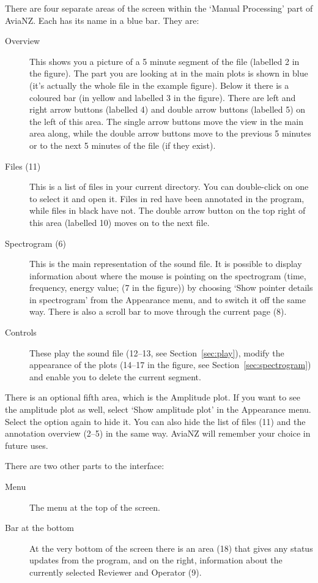 \documentclass{article}
\begin{document}
There are four separate areas of the screen within the `Manual Processing' part of AviaNZ. Each has its name in a blue bar. They are:
	\begin{description}
	\item[Overview] This shows you a picture of a 5 minute segment of the file (labelled 2 in the figure). The part you are looking at in the main plots is shown in blue (it's actually the whole file in the example figure). Below it there is a coloured bar (in yellow and labelled 3 in the figure). There are left and right arrow buttons (labelled 4) and double arrow buttons (labelled 5) on the left of this area. The single arrow buttons move the view in the main area along, while the double arrow buttons move to the previous 5 minutes or to the next 5 minutes of the file (if they exist). 
	\item [Files (11)] This is a list of files in your current directory. You can double-click on one to select it and open it. Files in red have been annotated in the program, while files in black have not. The double arrow button on the top right of this area (labelled 10) moves on to the next file.
	\item[Spectrogram (6)] This is the main representation of the sound file. It is possible to display information about where the mouse is pointing on the spectrogram (time, frequency, energy value; (7 in the figure)) by choosing `Show pointer details in spectrogram' from the Appearance menu, and to switch it off the same way. There is also a scroll bar to move through the current page (8).
	\item[Controls] These play the sound file (12--13, see Section~\ref{sec:play}), modify the appearance of the plots (14--17 in the figure, see Section~\ref{sec:spectrogram}) and enable you to delete the current segment.
	\end{description}

There is an optional fifth area, which is the Amplitude plot. If you want to see the amplitude plot as well, select `Show amplitude plot' in the Appearance menu. Select the option again to hide it. You can also hide the list of files (11) and the annotation overview (2--5) in the same way. AviaNZ will remember your choice in future uses.

There are two other parts to the interface:
	\begin{description}
	\item[Menu] The menu at the top of the screen. 
	\item[Bar at the bottom] At the very bottom of the screen there is an area (18) that gives any status updates from the program, and on the right, information about the currently selected Reviewer and Operator (9).
	\end{description}
\end{document}
